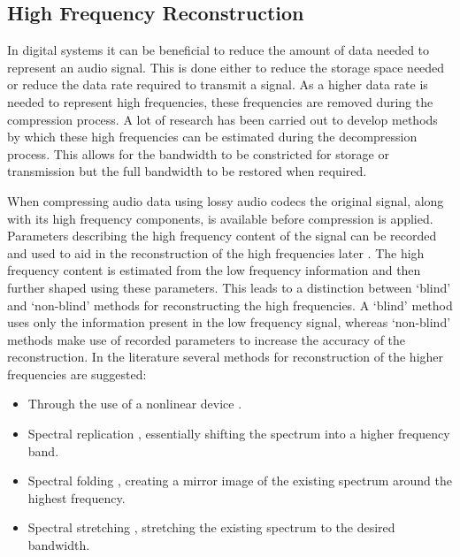 	\subsection{High Frequency Reconstruction}
	\label{sec:Excitation-Uses-Reconstruction}
		In digital systems it can be beneficial to reduce the amount of data needed to represent an audio signal.
		This is done either to reduce the storage space needed or reduce the data rate required to transmit a
		signal. As a higher data rate is needed to represent high frequencies, these frequencies are removed during
		the compression process. A lot of research has been carried out to develop methods by which these high
		frequencies can be estimated during the decompression process. This allows for the bandwidth to be
		constricted for storage or transmission but the full bandwidth to be restored when required.

		When compressing audio data using lossy audio codecs the original signal, along with its high frequency
		components, is available before compression is applied. Parameters describing the high frequency content of
		the signal can be recorded and used to aid in the reconstruction of the high frequencies later
		\citep{dietz2002spectral, friedrich2007spectral}. The high frequency content is estimated from the low
		frequency information and then further shaped using these parameters. This leads to a distinction between
		`blind' and `non-blind' methods for reconstructing the high frequencies. A `blind' method uses only the
		information present in the low frequency signal, whereas `non-blind' methods make use of recorded parameters
		to increase the accuracy of the reconstruction. In the literature several methods for reconstruction of the
		higher frequencies are suggested:

		\begin{itemize}
			\item Through the use of a nonlinear device \citep{larsen2002efficient, sha2010high}.
			\item Spectral replication \citep{nagel2010a}, essentially shifting the spectrum into a higher
			      frequency band.
			\item Spectral folding \citep{friedrich2007spectral}, creating a mirror image of the existing
			      spectrum around the highest frequency.
			\item Spectral stretching \citep{nagel2009a}, stretching the existing spectrum to the desired
			      bandwidth.
		\end{itemize}

